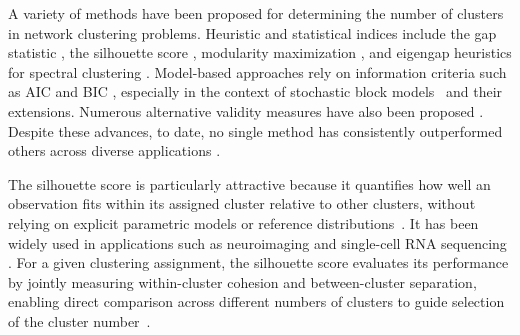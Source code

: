 \documentclass[12pt, titlepage, reqno]{article}
\begin{document}
A variety of methods have been proposed for determining the number of 
clusters in network clustering problems. Heuristic and statistical 
indices include the gap statistic \citep{tibshirani2001estimating}, 
the silhouette score \citep{rousseeuw1987silhouettes}, modularity 
maximization \citep{brandes2008onmodularity}, and eigengap heuristics 
for spectral clustering \citep{vonluxburg2007atutorial}. Model-based 
approaches rely on information criteria such as AIC and BIC
\citep{fraley2002model, spiegelhalter2002bayesian, 
hu2003acomparative}, especially in the context of stochastic block 
models~\citep{abbe2018community} and their
extensions. Numerous alternative validity measures have also been
proposed \citep{dunn1973fuzzy, calinski1974dendrite, 
davies1979cluster, xie1991validity}. Despite these advances, to
date, no single method has consistently outperformed others across
diverse applications \citep{arbelaitz2013extensive,
  liu2010understanding}.


The silhouette score is particularly attractive because it quantifies 
how well an observation fits within its assigned cluster relative to 
other clusters, without relying on explicit parametric models or 
reference 
distributions~\citep{rousseeuw1987silhouettes,shahapure2020cluster}. 
It has been widely used in applications such as neuroimaging
\citep{mwangi2014visualization,ryali2015development,
grossberger2018unsupervised} and single-cell RNA sequencing
\citep{xu2015identification,kiselev2017sc3}. For a given clustering 
assignment, the silhouette score evaluates its performance by jointly 
measuring within-cluster cohesion and between-cluster separation, 
enabling direct comparison across different numbers of clusters to 
guide selection of the cluster number~\citep{pavlopoulos2011using}.
\end{document}
